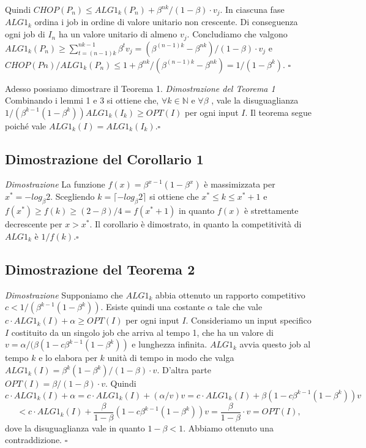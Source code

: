 \documentclass[12pt]{article}
\newcommand*{\N}{\mathbb{N}}
\begin{document}
Quindi $CHOP(P_{n}) \leq ALG1_{k}(P_{n})+\beta^{nk}/(1-\beta ) \cdot v_{j}$. In ciascuna fase $ALG1_{k}$ ordina i job in ordine di valore unitario non crescente. Di conseguenza ogni job di $I_{n}$ ha un valore unitario di almeno $v_{j}$. Concludiamo che valgono $ALG1_{k}(P_{n}) \geq \sum^{nk-1}_{t=(n-1)k} \beta^{t} v_{j} = (\beta^{(n-1)k} - \beta^{nk})/(1 -\beta ) \cdot v_{j}$ e $CHOP(Pn)/ALG1_{k}(P_{n}) \leq 1 + \beta^{nk}/(\beta^{(n-1)k} - \beta^{nk} ) = 1/(1 - \beta^{k})$. \hfill $\square$ \vspace{5mm}

Adesso possiamo dimostrare il Teorema 1.\newline \newline
\textit{Dimostrazione del Teorema 1} Combinando i lemmi 1 e 3 si ottiene che, $\forall k \in \N$ e $\forall \beta$ , vale la disuguaglianza $1/(\beta^{k-1}(1 - \beta^{k}))ALG1_{k}(I_{k}) \geq OPT(I)$ per ogni input $I$. Il teorema segue poiché vale $ALG1_{k}(I) = ALG1_{k}(I_{k})$.\hfill $\square$ \vspace{5mm}

\subsection{Dimostrazione del Corollario 1}
\textit{Dimostrazione}
La funzione $f(x) = \beta^{x - 1}(1 - \beta^{x})$ è massimizzata per $x^{*} = - log_{\beta}2$. Scegliendo $k = \lceil-log_{\beta} 2\rceil$ si ottiene che $x^{*} \leq k \leq x^{*} + 1$ e $f (x^{*}) \geq f (k) \geq (2 - \beta )/4 = f (x^{*} + 1)$ in quanto $f(x)$ è strettamente decrescente per $x > x^{*}$. Il corollario è dimostrato, in quanto la competitività di $ALG1_{k}$ è $1 / f (k)$.\hfill $\square$ \vspace{5mm}
\subsection{Dimostrazione del Teorema 2}
\textit{Dimostrazione}
Supponiamo che $ALG1_{k}$ abbia ottenuto un rapporto competitivo $c < 1 / (\beta^{k - 1} (1 - \beta^{k}))$. Esiste quindi una costante $\alpha$ tale che vale $c \cdot ALG1_{k}(I) + \alpha \geq OPT (I)$ per ogni input $I$. Consideriamo un input specifico $I$ costituito da un singolo job che arriva al tempo 1,  che ha un valore di $v = \alpha / (\beta  (1 - c \beta^{k - 1} (1 - \beta^{k}))$ e lunghezza infinita. $ALG1_{k}$ avvia questo job al tempo $k$ e lo elabora per $k$ unità di tempo in modo che valga $ALG1_{k}(I) = \beta^{k} (1 - \beta^{k}) / (1 - \beta ) \cdot v$. D'altra parte $OPT (I) = \beta  / (1 - \beta ) \cdot v$. Quindi $$c \cdot ALG1_{k}(I) + \alpha = c \cdot ALG1_{k}(I) + (\alpha / v) v = c \cdot ALG1_{k}(I) + \beta  (1 - c\beta^{k - 1} (1 - \beta^{k})) v $$ $$< c \cdot ALG1_{k}(I) + \frac{\beta}{ 1 - \beta} (1 - c\beta^{k - 1} (1 - \beta^{k})) v = \frac{\beta}{1 - \beta} \cdot v = OPT(I),$$dove la disuguaglianza vale in quanto $1 - \beta  <1$. Abbiamo ottenuto una contraddizione. \hfill $\square$ \vspace{5mm}
\end{document}
